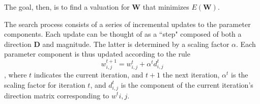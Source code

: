 
The goal, then, is to find a valuation for $\mathbf{W}$ that minimizes  $E(\mathbf{W})$. 



The search process consists of a series of incremental updates to the parameter components. Each update can be thought of as a ``step" composed of both a direction $\textbf{D}$ and magnitude. The latter is determined by a scaling factor $\alpha$.
Each parameter component is thus updated according to the rule
\begin{equation}\label{eq:gen-update}
w^{t+1}_{i,j} = w^{t}_{i,j} + \alpha^{t}d^{t}_{i,j}
\end{equation},
where $t$ indicates the current iteration, and $t+1$ the next iteration, $\alpha^{t}$ is the scaling factor for iteration $t$,  and $d^{t}_{i,j}$ is the component of the current iteration's direction matrix corresponding to $w^{t}{i,j}$. 

